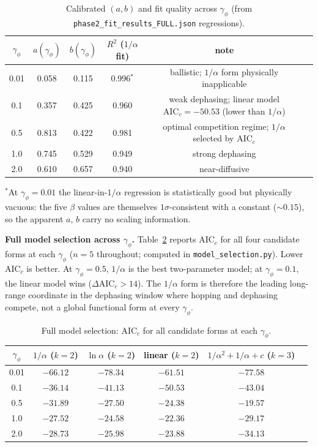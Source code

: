 \documentclass[aps,prb,twocolumn,superscriptaddress]{revtex4-2}
\begin{document}
\begin{table}[h]
\caption{Calibrated $(a, b)$ and fit quality across $\gamma_\phi$ (from \texttt{phase2\_fit\_results\_FULL.json} regressions).}
\label{tab:S2}
\begin{ruledtabular}
\begin{tabular}{cccccc}
$\gamma_\phi$ & $a(\gamma_\phi)$ & $b(\gamma_\phi)$ & $R^2$ ($1/\alpha$ fit) & note \\
\hline
0.01 & 0.058 & 0.115 & 0.996${}^*$ & ballistic; $1/\alpha$ form physically inapplicable \\
0.1  & 0.357 & 0.425 & 0.960 & weak dephasing; linear model $\text{AIC}_c = -50.53$ (lower than $1/\alpha$) \\
0.5  & 0.813 & 0.422 & 0.981 & optimal competition regime; $1/\alpha$ selected by $\text{AIC}_c$ \\
1.0  & 0.745 & 0.529 & 0.949 & strong dephasing \\
2.0  & 0.610 & 0.657 & 0.940 & near-diffusive \\
\end{tabular}
\end{ruledtabular}
${}^*$At $\gamma_\phi = 0.01$ the linear-in-$1/\alpha$ regression is statistically good but physically vacuous: the five $\beta$ values are themselves $1\sigma$-consistent with a constant (${\sim}0.15$), so the apparent $a$, $b$ carry no scaling information.
\end{table}

\textbf{Full model selection across $\gamma_\phi$.} Table~\ref{tab:S2b} reports $\text{AIC}_c$ for all four candidate forms at each $\gamma_\phi$ ($n=5$ throughout; computed in \texttt{model\_selection.py}). Lower $\text{AIC}_c$ is better. At $\gamma_\phi = 0.5$, $1/\alpha$ is the best two-parameter model; at $\gamma_\phi = 0.1$, the linear model wins ($\Delta\text{AIC}_c > 14$). The $1/\alpha$ form is therefore the leading long-range coordinate in the dephasing window where hopping and dephasing compete, not a global functional form at every $\gamma_\phi$.

\begin{table}[h]
\caption{Full model selection: $\text{AIC}_c$ for all candidate forms at each $\gamma_\phi$.}
\label{tab:S2b}
\begin{ruledtabular}
\begin{tabular}{cccccc}
$\gamma_\phi$ & $1/\alpha$ ($k=2$) & $\ln\alpha$ ($k=2$) & linear ($k=2$) & $1/\alpha^2 + 1/\alpha + c$ ($k=3$) \\
\hline
0.01 & $-66.12$ & $-78.34$ & $-61.51$ & $-77.58$ \\
0.1  & $-36.14$ & $-41.13$ & $\mathbf{-50.53}$ & $-43.04$ \\
0.5  & $\mathbf{-31.89}$ & $-27.50$ & $-24.38$ & $-19.57$ \\
1.0  & $\mathbf{-27.52}$ & $-24.58$ & $-22.36$ & $-29.17$ \\
2.0  & $-28.73$ & $-25.98$ & $-23.88$ & $\mathbf{-34.13}$ \\
\end{tabular}
\end{ruledtabular}
\end{table}
\end{document}
